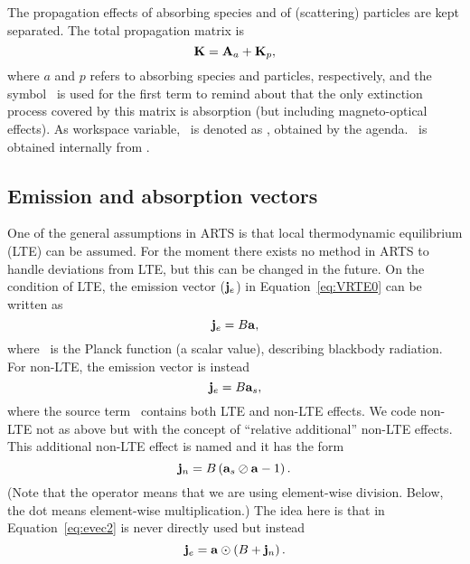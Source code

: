 The propagation effects of absorbing species and of (scattering) particles are
kept separated.
The total propagation matrix is 
\begin{equation}
  \label{eq:propmattotal}
  {\bf K} = {\bf A}_{a} + {\bf K}_{p}, 
\end{equation}
where $a$ and $p$ refers to absorbing species and particles, respectively, and
the symbol \AbsMat\ is used for the first term to remind about that the only
extinction process covered by this matrix is absorption (but including
magneto-optical effects). As workspace variable, \ is denoted as
, obtained by the
 agenda. \ is obtained
internally from .



\subsection{Emission and absorption vectors}
\label{sec:rteq:evec}

One of the general assumptions in ARTS is that local thermodynamic equilibrium
(LTE) can be assumed. For the moment there exists no method in ARTS to handle
deviations from LTE, but this can be changed in the future.
On the condition of LTE, the emission vector ($\mathbf{j}_e$) in
Equation~\ref{eq:VRTE0} can be written as
\begin{equation}
  \label{eq:evec1}
  {\bf j}_{e} = B {\bf a},
\end{equation}
where \Planck\ is the Planck function (a scalar value), describing blackbody
radiation. For non-LTE, the emission vector
is instead
\begin{equation}
  \label{eq:evec_withnlte1}
  {\bf j}_{e} = B{\bf a}_{s},
\end{equation}
where the source term \ contains both LTE and non-LTE effects.
We code non-LTE not as above but with the concept of ``relative additional'' non-LTE effects.  
This additional non-LTE effect is named  and it has the form
\begin{equation}
  \label{eq:nlte_source}
  {\bf j}_{n} = B\left({\bf a}_{s}\oslash{\bf a}-1\right).
\end{equation}
(Note that the operator means that we are using element-wise division.  Below, the dot means element-wise multiplication.)
The idea here is that  in Equation~\ref{eq:evec2} is never directly used
but instead
\begin{equation}
  \label{eq:evec_withnlte2}
  {\bf j}_{e} = {\bf a}\odot\left(B + {\bf j}_{n}\right).
\end{equation}

